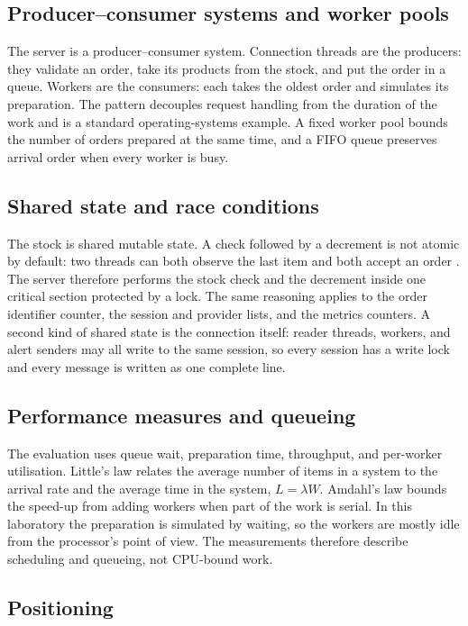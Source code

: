 \documentclass[12pt,a4paper]{article}
\begin{document}
\subsection{Producer--consumer systems and worker pools}

The server is a producer--consumer system. Connection threads are the producers:
they validate an order, take its products from the stock, and put the order in a
queue. Workers are the consumers: each takes the oldest order and simulates its
preparation. The pattern decouples request handling from the duration of the
work and is a standard operating-systems example. A fixed
worker pool bounds the number of orders prepared at the same time, and a FIFO
queue preserves arrival order when every worker is busy.

\subsection{Shared state and race conditions}

The stock is shared mutable state. A check followed by a decrement is not atomic
by default: two threads can both observe the last item and both accept an order
. The server therefore performs the stock check and the decrement
inside one critical section protected by a lock. The same reasoning applies to
the order identifier counter, the session and provider lists, and the metrics
counters. A second kind of shared state is the connection itself: reader threads,
workers, and alert senders may all write to the same session, so every session
has a write lock and every message is written as one complete line.

\subsection{Performance measures and queueing}

The evaluation uses queue wait, preparation time, throughput, and per-worker
utilisation. Little's law relates the average number of items in a system to the
arrival rate and the average time in the system, $L=\lambda W$.
Amdahl's law bounds the speed-up from adding workers when part of the work is
serial. In this laboratory the preparation is simulated by waiting,
so the workers are mostly idle from the processor's point of view. The
measurements therefore describe scheduling and queueing, not CPU-bound work.

\subsection{Positioning}
\end{document}
